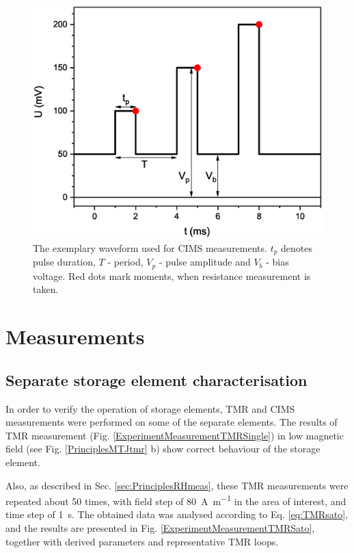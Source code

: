     \begin{figure}[H]
        \centering
        \includegraphics[width=0.55\paperwidth]{img/05/MeasurementWaveform.eps}
        \caption{The exemplary waveform used for CIMS measurements. $t_p$ denotes pulse duration, $T$ - period, $V_p$ - pulse amplitude and $V_b$ - bias voltage. Red dots mark moments, when resistance measurement is taken.}
        \label{ExperimentMeasurementCimsWaveform}
    \end{figure}
    
\section{Measurements} \label{sec:ExperimentMeasurements}
\subsection{Separate storage element characterisation} \label{sec:ExperimentMeasurementsSeparate}

    In order to verify the operation of storage elements, TMR and CIMS measurements were performed on some of the separate elements. The results of TMR measurement (Fig. \ref{ExperimentMeasurementTMRSingle}) in low magnetic field (see Fig. \ref{PrinciplesMTJtmr} b) show correct behaviour of the storage element. 
    
    Also, as described in Sec. \ref{sec:PrinciplesRHmeas}, these TMR measurements were repeated about 50 times, with field step of \SI[per-mode=symbol]{80}{\ampere\per\metre} in the area of interest, and time step of \SI{1}{\second}. The obtained data was analysed according to Eq. \ref{eq:TMRsato}, and the results are presented in Fig. \ref{ExperimentMeasurementTMRSato}, together with derived parameters and representative TMR loops.
    
